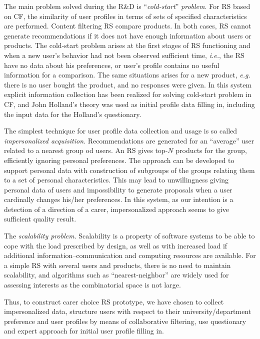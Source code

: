 \documentclass[conference,a4]{IEEEtran}
\begin{document}
The main problem solved during the R\&D is ``\emph{cold-start}'' \emph{problem}.  For RS based on CF, the similarity of user profiles in terms of sets of specified characteristics are performed. Content filtering RS compare products. In both cases, RS cannot generate recommendations if it does not have enough information about users or products.  The cold-start problem arises at the first stages of RS functioning and when a new user's behavior had not been observed sufficient time, \emph{i.e.}, the RS have no data about his preferences, or user's profile contains no useful information for a comparison.  The same situations arises for a new product, \emph{e.g.} there is no user bought the product, and no responses were given.  In this system explicit information collection has been realized for solving cold-start problem in CF, and John Holland's theory was used as initial profile data filling in, including the input data for the Holland's questionary.

The simplest technique for user profile data collection and usage is so called \emph{impersonalized acquisition}.  Recommendations are generated for an ``average'' user related to a nearest group od users.  An RS gives top-$N$ products for the group, efficiently ignoring personal preferences.  The approach can be developed to support personal data with construction of subgroups of the groups relating them to a set of personal characteristics.  This may lead to unwillingness giving personal data of users and impossibility to generate proposals when a user cardinally changes his/her preferences.  In this system, as our intention is a detection of a direction of a carer, impersonalized approach seems to give sufficient quality result.

The \emph{scalability problem}. Scalability is a property of software systems to be able to cope with the load prescribed by design, as well as with increased load if additional information--communication and computing resources are available.  For a simple RS with several users and products, there is no need to maintain scalability, and algorithms such as ``nearest-neighbor'' are widely used for assessing interests as the combinatorial space is not large. %

Thus, to construct carer choice RS prototype, we have chosen to collect impersonalized data, structure users with respect to their university/department preference and user profiles by means of collaborative filtering, use questionary and expert approach for initial user profile filling in.
\end{document}
